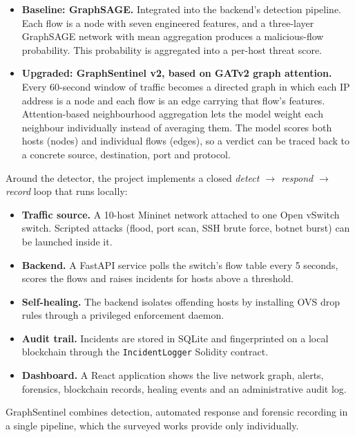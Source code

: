 \documentclass[12pt,a4paper]{report}
\begin{document}
\begin{itemize}
    \item \textbf{Baseline: GraphSAGE.} Integrated into the backend's detection pipeline. Each flow is a node with seven engineered features, and a three-layer GraphSAGE network with mean aggregation produces a malicious-flow probability. This probability is aggregated into a per-host threat score.
    \item \textbf{Upgraded: GraphSentinel v2, based on GATv2 graph attention.} Every 60-second window of traffic becomes a directed graph in which each IP address is a node and each flow is an edge carrying that flow's features. Attention-based neighbourhood aggregation lets the model weight each neighbour individually instead of averaging them. The model scores both hosts (nodes) and individual flows (edges), so a verdict can be traced back to a concrete source, destination, port and protocol.
\end{itemize}
\par
\par
Around the detector, the project implements a closed \emph{detect $\rightarrow$ respond $\rightarrow$ record} loop that runs locally:
\begin{itemize}
    \item \textbf{Traffic source.} A 10-host Mininet network attached to one Open vSwitch switch. Scripted attacks (flood, port scan, SSH brute force, botnet burst) can be launched inside it.
    \item \textbf{Backend.} A FastAPI service polls the switch's flow table every 5 seconds, scores the flows and raises incidents for hosts above a threshold.
    \item \textbf{Self-healing.} The backend isolates offending hosts by installing OVS drop rules through a privileged enforcement daemon.
    \item \textbf{Audit trail.} Incidents are stored in SQLite and fingerprinted on a local blockchain through the \texttt{IncidentLogger} Solidity contract.
    \item \textbf{Dashboard.} A React application shows the live network graph, alerts, forensics, blockchain records, healing events and an administrative audit log.
\end{itemize}
\par
GraphSentinel combines detection, automated response and forensic recording in a single pipeline, which the surveyed works provide only individually.
\end{document}
